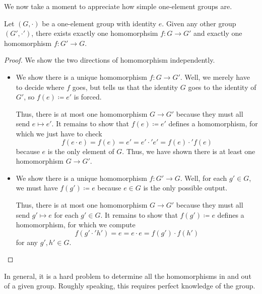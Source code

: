 \documentclass[../notes.tex]{subfiles}
\begin{document}
We now take a moment to appreciate how simple one-element groups are.
\begin{proposition} \label{prop:trivial-homs}
    Let $(G,\cdot)$ be a one-element group with identity $e$. Given any other group $(G',\cdot')$, there exists exactly one homomorphsim $f\colon G\to G'$ and exactly one homomorphism $f\colon G'\to G$.
\end{proposition}
\begin{proof}
    We show the two directions of homomorphism independently.
    \begin{itemize}
        \item We show there is a unique homomorphism $f\colon G\to G'$. Well, we merely have to decide where $f$ goes, but  tells us that the identity $G$ goes to the identity of $G'$, so $f(e)\coloneqq e'$ is forced.
        
        Thus, there is at most one homomorphism $G\to G'$ because they must all send $e\mapsto e'$. It remains to show that $f(e)\coloneqq e'$ defines a homomorphism, for which we just have to check
        \[f(e\cdot e)=f(e)=e'=e'\cdot'e'=f(e)\cdot'f(e)\]
        because $e$ is the only element of $G$. Thus, we have shown there is at least one homomorphism $G\to G'$.
        
        \item We show there is a unique homomorphism $f\colon G'\to G$. Well, for each $g'\in G$, we must have $f(g')\coloneqq e$ because $e\in G$ is the only possible output.
        
        Thus, there is at most one homomorphism $G\to G'$ because they must all send $g'\mapsto e$ for each $g'\in G$. It remains to show that $f(g')\coloneqq e$ defines a homomorphism, for which we compute
        \[f(g'\cdot'h')=e=e\cdot e=f(g')\cdot f(h')\]
        for any $g',h'\in G$.
        \qedhere
    \end{itemize}
\end{proof}
In general, it is a hard problem to determine all the homomorphisms in and out of a given group. Roughly speaking, this requires perfect knowledge of the group.
\end{document}
